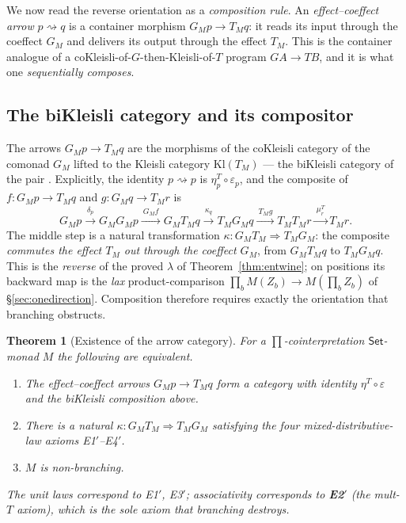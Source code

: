 \documentclass[11pt]{amsart}
\theoremstyle{plain}
\newtheorem{theorem}{Theorem}[section]
\theoremstyle{definition}
\theoremstyle{remark}
\newcommand{\Set}{\mathsf{Set}}
\newcommand{\Kl}{\mathrm{Kl}}
\begin{document}
We now read the reverse orientation as a \emph{composition rule}. An \emph{effect--coeffect
arrow} $p\rightsquigarrow q$ is a container morphism $G_M p\to T_M q$: it reads its input
through the coeffect $G_M$ and delivers its output through the effect $T_M$. This is the
container analogue of a coKleisli-of-$G$-then-Kleisli-of-$T$ program $GA\to TB$, and it is
what one \emph{sequentially composes}.

\subsection{The biKleisli category and its compositor}
The arrows $G_M p\to T_M q$ are the morphisms of the coKleisli category of the comonad $G_M$
lifted to the Kleisli category $\Kl(T_M)$ --- the biKleisli category of the pair
\cite{PowerWatanabe02,UustaluVene08}. Explicitly, the identity $p\rightsquigarrow p$ is
$\eta^T_p\circ\varepsilon_p$, and the composite of $f\colon G_M p\to T_M q$ and
$g\colon G_M q\to T_M r$ is
\[
  G_M p \xrightarrow{\ \delta_p\ } G_M G_M p \xrightarrow{\ G_M f\ } G_M T_M q
      \xrightarrow{\ \kappa_q\ } T_M G_M q \xrightarrow{\ T_M g\ } T_M T_M r
      \xrightarrow{\ \mu^T_r\ } T_M r.
\]
The middle step is a natural transformation $\kappa\colon G_M T_M\Rightarrow T_M G_M$: the
composite \emph{commutes the effect $T_M$ out through the coeffect $G_M$}, from $G_M T_M q$ to
$T_M G_M q$. This is the \emph{reverse} of the proved $\lambda$ of Theorem~\ref{thm:entwine};
on positions its backward map is the \emph{lax} product-comparison $\prod_b M(Z_b)\to
M(\prod_b Z_b)$ of \S\ref{sec:onedirection}. Composition therefore requires exactly the
orientation that branching obstructs.

\begin{theorem}[Existence of the arrow category]\label{thm:arrowsA}
For a $\prod$-cointerpretation $\Set$-monad $M$ the following are equivalent.
\begin{enumerate}
  \item The effect--coeffect arrows $G_M p\to T_M q$ form a category with identity
  $\eta^T\circ\varepsilon$ and the biKleisli composition above.
  \item There is a natural $\kappa\colon G_M T_M\Rightarrow T_M G_M$ satisfying the four
  mixed-distributive-law axioms E1$'$--E4$'$.
  \item $M$ is non-branching.
\end{enumerate}
The unit laws correspond to E1$'$, E3$'$; associativity corresponds to \textbf{E2$'$} (the
mult-$T$ axiom), which is the sole axiom that branching destroys.
\end{theorem}
\end{document}
